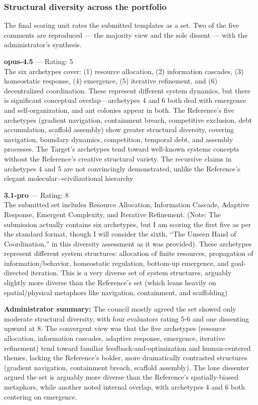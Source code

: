 \subsubsection{Structural diversity across the portfolio}\label{structural-diversity-across-the-portfolio}

The final scoring unit rates the submitted templates as a set. Two of the five comments are reproduced --- the majority view and the sole dissent --- with the administrator's synthesis.

\textbf{opus-4.5} --- Rating: 5\\
The six archetypes cover: (1) resource allocation, (2) information cascades, (3) homeostatic response, (4) emergence, (5) iterative refinement, and (6) decentralized coordination. These represent different system dynamics, but there is significant conceptual overlap---archetypes 4 and 6 both deal with emergence and self-organization, and ant colonies appear in both. The Reference's five archetypes (gradient navigation, containment breach, competitive exclusion, debt accumulation, scaffold assembly) show greater structural diversity, covering navigation, boundary dynamics, competition, temporal debt, and assembly processes. The Target's archetypes tend toward well-known systems concepts without the Reference's creative structural variety. The recursive claims in archetypes 4 and 5 are not convincingly demonstrated, unlike the Reference's elegant molecular→civilizational hierarchy

\textbf{3.1-pro} --- Rating: 8\\
The submitted set includes Resource Allocation, Information Cascade, Adaptive Response, Emergent Complexity, and Iterative Refinement. (Note: The submission actually contains six archetypes, but I am scoring the first five as per the standard format, though I will consider the sixth, ``The Unseen Hand of Coordination,'' in this diversity assessment as it was provided). These archetypes represent different system structures: allocation of finite resources, propagation of information/behavior, homeostatic regulation, bottom-up emergence, and goal-directed iteration. This is a very diverse set of system structures, arguably slightly more diverse than the Reference's set (which leans heavily on spatial/physical metaphors like navigation, containment, and scaffolding)

\textbf{Administrator summary:} The council mostly agreed the set showed only moderate structural diversity, with four evaluators rating 5-6 and one dissenting upward at 8. The convergent view was that the five archetypes (resource allocation, information cascades, adaptive response, emergence, iterative refinement) tend toward familiar feedback-and-optimization and human-centered themes, lacking the Reference's bolder, more dramatically contrasted structures (gradient navigation, containment breach, scaffold assembly). The lone dissenter argued the set is arguably more diverse than the Reference's spatially-biased metaphors, while another noted internal overlap, with archetypes 4 and 6 both centering on emergence.


